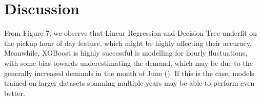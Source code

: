 \documentclass[11pt]{article}
\begin{document}
\section{Discussion}
From Figure 7, we observe that Linear Regression and Decision Tree underfit on the pickup hour of day feature, which might be highly affecting their accuracy. Meanwhile, XGBoost is highly successful is modelling for hourly fluctuations, with some bias towards underestimating the demand, which may be due to the generally increased demands in the month of June (). If this is the case, models trained on larger datasets spanning multiple years may be able to perform even better.
\begin{figure}[H]
\begin{floatrow}
\end{floatrow}
\end{figure}
\end{document}
